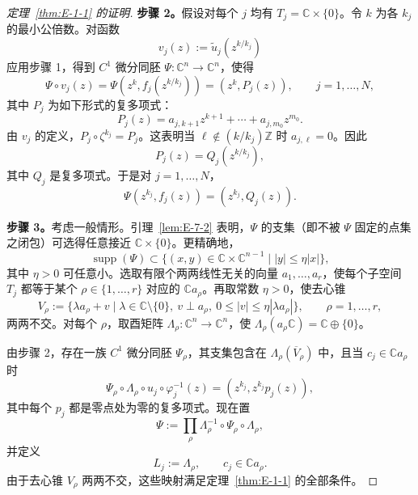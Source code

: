 \begin{proof}[定理~\ref{thm:E-1-1} 的证明]
\noindent\textbf{步骤 2。}假设对每个 $j$ 均有 $T_j=\mathbb C\times\{0\}$。令 $k$ 为各 $k_j$ 的最小公倍数。对函数
\[
  v_j(z):=\widetilde u_j(z^{k/k_j})
\]
应用步骤 1，得到 $C^1$ 微分同胚 $\Psi:\mathbb C^n\to\mathbb C^n$，使得
\[
  \Psi\circ v_j(z)
    =\Psi(z^k,f_j(z^{k/k_j}))=(z^k,P_j(z)),
  \qquad j=1,\ldots,N,
\]
其中 $P_j$ 为如下形式的复多项式：
\[
  P_j(z)=a_{j,k+1}z^{k+1}+\cdots+a_{j,m_0}z^{m_0}.
\]
由 $v_j$ 的定义，$P_j\circ\zeta^{k_j}=P_j$。这表明当 $\ell\notin(k/k_j)\mathbb Z$ 时 $a_{j,\ell}=0$。因此
\[
  P_j(z)=Q_j(z^{k/k_j}),
\]
其中 $Q_j$ 是复多项式。于是对 $j=1,\ldots,N$，
\[
  \Psi(z^{k_j},f_j(z))=(z^{k_j},Q_j(z)).
\]

\noindent\textbf{步骤 3。}考虑一般情形。引理~\ref{lem:E-7-2} 表明，$\Psi$ 的支集（即不被 $\Psi$ 固定的点集之闭包）可选得任意接近 $\mathbb C\times\{0\}$。更精确地，
\[
  \operatorname{supp}(\Psi)
  \subset\{(x,y)\in\mathbb C\times\mathbb C^{n-1}\mid
             |y|\le\eta|x|\},
\]
其中 $\eta>0$ 可任意小。选取有限个两两线性无关的向量 $a_1,\ldots,a_r$，使每个子空间 $T_j$ 都等于某个 $\rho\in\{1,\ldots,r\}$ 对应的 $\mathbb Ca_\rho$。再取常数 $\eta>0$，使去心锥
\[
  V_\rho:=\{\lambda a_\rho+v\mid
       \lambda\in\mathbb C\setminus\{0\},\ v\perp a_\rho,
       \ 0\le|v|\le\eta|\lambda a_\rho|\},
  \qquad\rho=1,\ldots,r,
\]
两两不交。对每个 $\rho$，取酉矩阵 $\Lambda_\rho:\mathbb C^n\to\mathbb C^n$，使 $\Lambda_\rho(a_\rho\mathbb C)=\mathbb C\oplus\{0\}$。

由步骤 2，存在一族 $C^1$ 微分同胚 $\Psi_\rho$，其支集包含在 $\Lambda_\rho(\overline V_\rho)$ 中，且当 $c_j\in\mathbb Ca_\rho$ 时
\[
  \Psi_\rho\circ\Lambda_\rho\circ u_j\circ\varphi_j^{-1}(z)
    =(z^{k_j},z^{k_j}p_j(z)),
\]
其中每个 $p_j$ 都是零点处为零的复多项式。现在置
\[
  \Psi:=\prod_\rho
     \Lambda_\rho^{-1}\circ\Psi_\rho\circ\Lambda_\rho,
\]
并定义
\[
  L_j:=\Lambda_\rho,\qquad c_j\in\mathbb Ca_\rho.
\]
由于去心锥 $V_\rho$ 两两不交，这些映射满足定理~\ref{thm:E-1-1} 的全部条件。
\end{proof}
